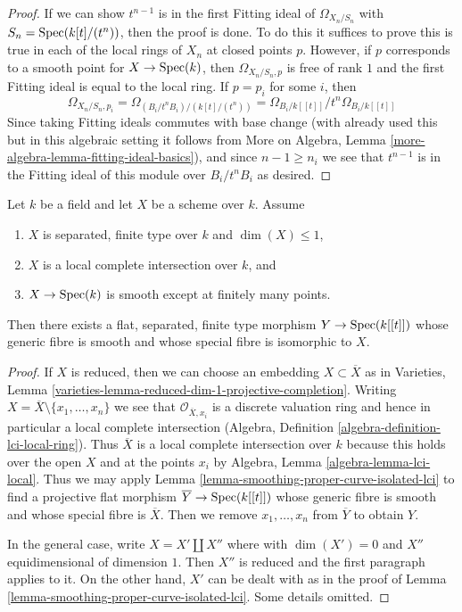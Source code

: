 \begin{proof}
If we can show $t^{n - 1}$ is in the first Fitting ideal of
$\Omega_{X_n/S_n}$ with $S_n = \mathop{\mathrm{Spec}}(k[t]/(t^n))$, then the proof is done.
To do this it suffices to prove this is true in each of
the local rings of $X_n$ at closed points $p$.
However, if $p$ corresponds to a smooth point for $X \to \mathop{\mathrm{Spec}}(k)$,
then $\Omega_{X_n/S_n, p}$ is free of rank $1$ and the first Fitting
ideal is equal to the local ring. If $p = p_i$ for some $i$, then
$$
\Omega_{X_n/S_n, p_i} =
\Omega_{(B_i/t^nB_i)/(k[t]/(t^n))} =
\Omega_{B_i/k[[t]]}/t^n\Omega_{B_i/k[[t]]}
$$
Since taking Fitting ideals commutes with base change
(with already used this but in this algebraic setting
it follows from More on Algebra, Lemma
\ref{more-algebra-lemma-fitting-ideal-basics}),
and since $n - 1 \geq n_i$ we see that $t^{n - 1}$ is
in the Fitting ideal of this module over $B_i/t^nB_i$ as desired.
\end{proof}

\begin{lemma}
\label{lemma-smoothing-curve-isolated-lci}
Let $k$ be a field and let $X$ be a scheme over $k$. Assume
\begin{enumerate}
\item $X$ is separated, finite type over $k$ and $\dim(X) \leq 1$,
\item $X$ is a local complete intersection over $k$, and
\item $X \to \mathop{\mathrm{Spec}}(k)$ is smooth except at finitely many points.
\end{enumerate}
Then there exists a flat, separated, finite type morphism $Y \to \mathop{\mathrm{Spec}}(k[[t]])$
whose generic fibre is smooth and whose special fibre is
isomorphic to $X$.
\end{lemma}

\begin{proof}
If $X$ is reduced, then we can choose an embedding
$X \subset \overline{X}$ as in
Varieties, Lemma \ref{varieties-lemma-reduced-dim-1-projective-completion}.
Writing $X = \overline{X} \setminus \{x_1, \ldots, x_n\}$
we see that $\mathcal{O}_{\overline{X}, x_i}$ is a discrete
valuation ring and hence in particular a local complete intersection
(Algebra, Definition \ref{algebra-definition-lci-local-ring}).
Thus $\overline{X}$ is a local complete intersection
over $k$ because this holds over the open $X$ and
at the points $x_i$ by Algebra, Lemma \ref{algebra-lemma-lci-local}.
Thus we may apply Lemma \ref{lemma-smoothing-proper-curve-isolated-lci}
to find a projective flat morphism $\overline{Y} \to \mathop{\mathrm{Spec}}(k[[t]])$
whose generic fibre is smooth and whose special fibre
is $\overline{X}$. Then we remove $x_1, \ldots, x_n$
from $\overline{Y}$ to obtain $Y$.

\medskip\noindent
In the general case, write $X = X' \amalg X''$ where
with $\dim(X') = 0$ and $X''$ equidimensional of dimension $1$.
Then $X''$ is reduced and the first paragraph applies to it.
On the other hand, $X'$ can be dealt with
as in the proof of Lemma \ref{lemma-smoothing-proper-curve-isolated-lci}.
Some details omitted.
\end{proof}











